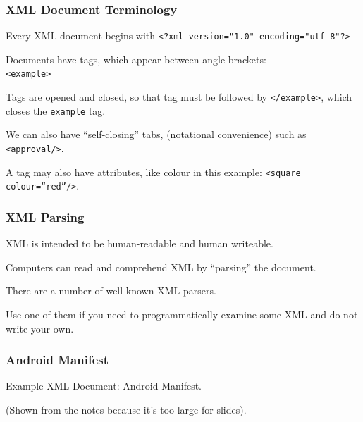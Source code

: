 \begin{frame}[fragile]
\frametitle{XML Document Terminology}
\begin{changemargin}{1cm}

Every XML document begins with \verb+<?xml version="1.0" encoding="utf-8"?>+

Documents have \alert{tags}, which appear between angle brackets:\\
\quad \texttt{<example>}

Tags are opened and closed, so that tag must be followed by \texttt{</example>}, which closes the \texttt{example} tag. 

We can also have ``self-closing'' tabs, (notational convenience) such as \texttt{<approval/>}.

A tag may also have attributes, like colour in this example: \texttt{<square colour=``red''/>}.

\end{changemargin}
\end{frame}

\begin{frame}
\frametitle{XML Parsing}
\begin{changemargin}{1cm}

XML is intended to be human-readable and human writeable. 

Computers can read and comprehend XML by ``parsing'' the document. 

There are a number of well-known XML parsers.

Use one of them if you need to programmatically examine some XML and do not write your own.

\end{changemargin}
\end{frame}


\begin{frame}[fragile]
\frametitle{Android Manifest}
\begin{changemargin}{1cm}
Example XML Document: Android Manifest.


(Shown from the notes because it's too large for slides).

\end{changemargin}
\end{frame}



